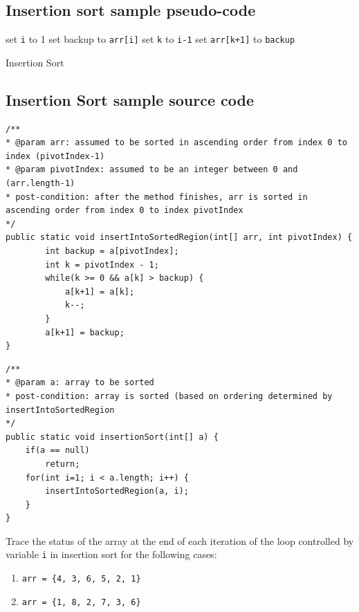 \subsection{Insertion sort sample pseudo-code}

\IncMargin{1em}
\begin{algorithm}[H]
	\SetAlgoLined
{}
set \texttt{i} to 1\;
 {
	set backup to \texttt{arr[i]}\;
	set \texttt{k} to \texttt{i-1}\;
	set \texttt{arr[k+1]} to \texttt{backup}\;
}
\caption{Insertion Sort \label{insertionsort}}
\end{algorithm}

\newpage
\subsection{Insertion Sort sample source code}

\begin{lstlisting}
/**
* @param arr: assumed to be sorted in ascending order from index 0 to index (pivotIndex-1)
* @param pivotIndex: assumed to be an integer between 0 and (arr.length-1)
* post-condition: after the method finishes, arr is sorted in ascending order from index 0 to index pivotIndex
*/
public static void insertIntoSortedRegion(int[] arr, int pivotIndex) {
		int backup = a[pivotIndex]; 
		int k = pivotIndex - 1;
		while(k >= 0 && a[k] > backup) { 
			a[k+1] = a[k]; 
			k--;
		}
		a[k+1] = backup; 
}
\end{lstlisting}

\begin{lstlisting}
/**
* @param a: array to be sorted
* post-condition: array is sorted (based on ordering determined by insertIntoSortedRegion 
*/
public static void insertionSort(int[] a) {
	if(a == null)
		return;
	for(int i=1; i < a.length; i++) {
		insertIntoSortedRegion(a, i);
	}
}
\end{lstlisting}

\begin{exercise}
Trace the status of the array at the end of each iteration of the loop controlled by variable \texttt{i} in insertion sort for the following cases:

\begin{enumerate}
\item \texttt{arr = \{4, 3, 6, 5, 2, 1\}}
\item \texttt{arr = \{1, 8, 2, 7, 3, 6\}}
\end{enumerate}
\end{exercise}

